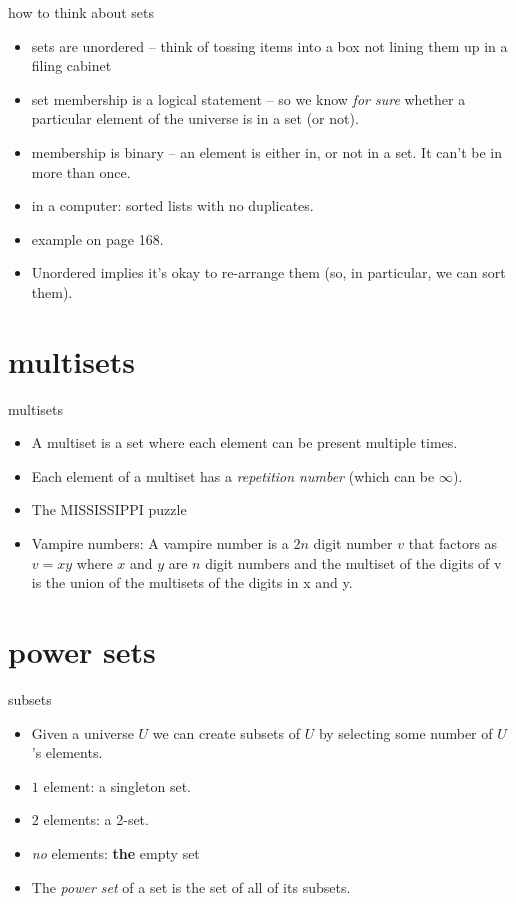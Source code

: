 \documentclass[handout,landscape]{beamer}
\begin{document}
\begin{frame}{how to think about sets}
\begin{itemize}
\item sets are unordered -- think of tossing items into a box not lining them up in a filing cabinet\pause
\item set membership is a logical statement -- so we know {\em for sure} whether a particular element of the universe is in a set (or not).\pause
\item membership is binary -- an element is either in, or not in a set.  It can't be in more than once.\pause
\item in a computer: sorted lists with no duplicates. \pause
\item example on page 168. \pause
\item Unordered implies it's okay to re-arrange them (so, in particular, we can sort them).
\end{itemize}
\end{frame}

\section{multisets}

\begin{frame}{multisets}
\begin{itemize}
\item A multiset is a set where each element can be present multiple times.\pause
\item Each element of a multiset has a {\em repetition number} (which can be $\infty$).\pause
\item The MISSISSIPPI puzzle\pause
\item Vampire numbers: \pause \newline
A vampire number is a $2n$ digit number $v$ that factors as $v = xy$ where
$x$ and $y$ are $n$ digit numbers and the multiset of the digits of v is the union of the
multisets of the digits in x and y.
\end{itemize}
\end{frame}

\section{power sets}

\begin{frame}{subsets}
\begin{itemize}
\item Given a universe $U$ we can create subsets of $U$ by selecting some number of $U$'s elements. \pause
\item $1$ element: a singleton set. \pause
\item $2$ elements: a 2-set.\pause
\item {\em no} elements: {\bf the} empty set\pause
\item The {\em power set} of a set is the set of all of its subsets.
\end{itemize}
\end{frame}
\end{document}
